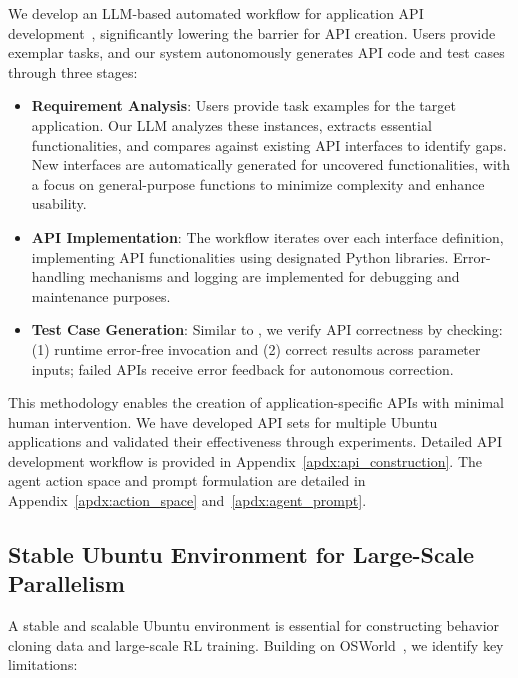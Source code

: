 We develop an LLM-based automated workflow for application API development~\citep{yang2024swe,wang2024openhands}, significantly lowering the barrier for API creation. Users provide exemplar tasks, and our system autonomously generates API code and test cases through three stages:
\begin{itemize}[leftmargin=1.5em,itemsep=0pt,parsep=0.2em,topsep=0.0em,partopsep=0.0em]
    \item \textbf{Requirement Analysis}: Users provide task examples for the target application. Our LLM analyzes these instances, extracts essential functionalities, and compares against existing API interfaces to identify gaps. New interfaces are automatically generated for uncovered functionalities, with a focus on general-purpose functions to minimize complexity and enhance usability.

    \item \textbf{API Implementation}: The workflow iterates over each interface definition, implementing API functionalities using designated Python libraries. Error-handling mechanisms and logging are implemented for debugging and maintenance purposes.

    \item \textbf{Test Case Generation}: Similar to \citet{li2024largelanguagemodelstest}, we verify API correctness by checking: (1) runtime error-free invocation and (2) correct results across parameter inputs; failed APIs receive error feedback for autonomous correction.
\end{itemize}

This methodology enables the creation of application-specific APIs with minimal human intervention. We have developed API sets for multiple Ubuntu applications and validated their effectiveness through experiments. Detailed API development workflow is provided in Appendix~\ref{apdx:api_construction}.
The agent action space and prompt formulation are detailed in Appendix~\ref{apdx:action_space} and~\ref{apdx:agent_prompt}.
    
\subsection{Stable Ubuntu Environment for Large-Scale Parallelism}\label{sec:stable-ubuntu}
A stable and scalable Ubuntu environment is essential for constructing behavior cloning data and large-scale RL training. Building on OSWorld~\citep{xie2024osworld}, we identify key limitations:

